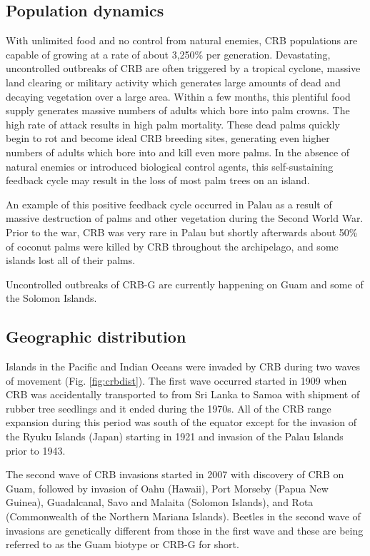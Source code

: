 \documentclass[twocolumn,letterpaper]{scrartcl}
\begin{document}
\subsection{Population dynamics}

With unlimited food and no control from natural enemies, CRB populations are capable of growing at a rate of about 3,250\% per generation. Devastating, uncontrolled outbreaks of CRB are often triggered by a tropical cyclone, massive land clearing or military activity which generates large amounts of dead and decaying vegetation over a large area. Within a few months, this plentiful food supply generates massive numbers of adults which bore into palm crowns. The high rate of attack results in high palm mortality. These dead palms quickly begin to rot and become ideal CRB breeding sites, generating even higher numbers of adults which bore into and kill even more palms. In the absence of natural enemies or introduced biological control agents, this self-sustaining feedback cycle may result in the loss of most palm trees on an island. 

An example of this positive feedback cycle occurred in Palau as a result of massive destruction of palms and other vegetation during the Second World War. Prior to the war, CRB was very rare in Palau but shortly afterwards about 50\% of coconut palms were killed by CRB throughout the archipelago, and some islands lost all of their palms.

Uncontrolled outbreaks of CRB-G are currently happening on Guam and some of the Solomon Islands.

\subsection{Geographic distribution}

Islands in the Pacific and Indian Oceans were invaded by CRB during two waves of movement (Fig. \ref{fig:crbdist}). The first wave occurred started in 1909 when CRB was accidentally transported to from Sri Lanka to Samoa with shipment of rubber tree seedlings and it ended during the 1970s. All of the CRB range expansion during this period was south of the equator except for the invasion of the Ryuku Islands (Japan) starting in 1921 and invasion of the Palau Islands prior to 1943.

The second wave of CRB invasions started in 2007 with discovery of CRB on Guam, followed by invasion of Oahu (Hawaii), Port Morseby (Papua New Guinea), Guadalcanal, Savo and Malaita (Solomon Islands), and Rota (Commonwealth of the Northern Mariana Islands). Beetles in the second wave of invasions are genetically different from those in the first wave and these are being referred to as the Guam biotype or CRB-G for short.
\end{document}
